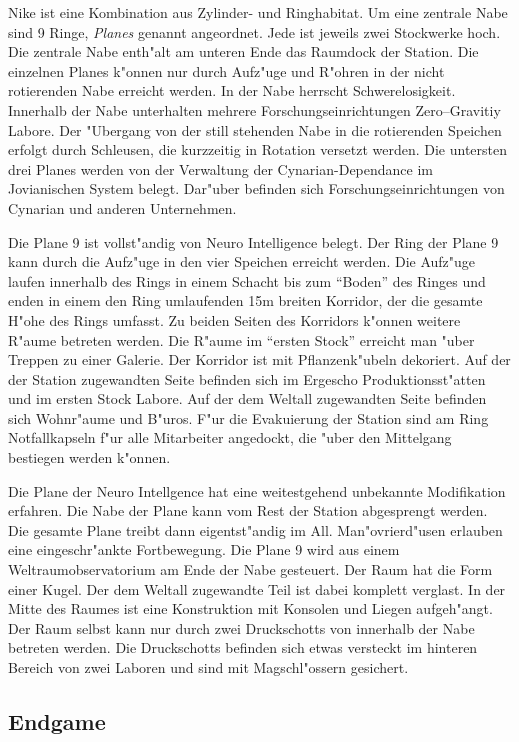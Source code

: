 Nike ist eine Kombination aus Zylinder- und Ringhabitat. Um eine zentrale Nabe sind 9 Ringe, \emph{Planes} genannt angeordnet. Jede ist jeweils zwei Stockwerke hoch. Die zentrale Nabe enth"alt am unteren Ende das Raumdock der Station.  Die einzelnen Planes k"onnen nur durch Aufz"uge und R"ohren in der nicht rotierenden Nabe erreicht werden. In der Nabe herrscht Schwerelosigkeit. Innerhalb der Nabe unterhalten mehrere Forschungseinrichtungen Zero--Gravitiy Labore. Der "Ubergang von der still stehenden Nabe in die rotierenden Speichen erfolgt durch Schleusen, die kurzzeitig in Rotation versetzt werden. Die untersten drei Planes werden von der Verwaltung der Cynarian-Dependance im Jovianischen System belegt. Dar"uber befinden sich Forschungseinrichtungen von Cynarian und anderen Unternehmen.

Die Plane 9 ist vollst"andig von Neuro Intelligence belegt. Der Ring der Plane 9 kann durch die Aufz"uge in den vier Speichen erreicht werden. Die Aufz"uge laufen innerhalb des Rings in einem Schacht bis zum "`Boden"' des Ringes und enden in einem den Ring umlaufenden 15m breiten Korridor, der die gesamte H"ohe des Rings umfasst. Zu beiden Seiten des Korridors k"onnen weitere R"aume betreten werden. Die R"aume im "`ersten Stock"' erreicht man "uber Treppen zu einer Galerie. Der Korridor ist mit Pflanzenk"ubeln dekoriert. Auf der der Station zugewandten Seite befinden sich im Ergescho\3 Produktionsst"atten und im ersten Stock Labore. Auf der dem Weltall zugewandten Seite befinden sich Wohnr"aume und B"uros. F"ur die Evakuierung der Station sind am Ring Notfallkapseln f"ur alle Mitarbeiter angedockt, die "uber den Mittelgang bestiegen werden k"onnen.

Die Plane der Neuro Intellgence hat eine weitestgehend unbekannte Modifikation erfahren. Die Nabe der Plane kann vom Rest der Station abgesprengt werden. Die gesamte Plane treibt dann eigentst"andig im All. Man"ovrierd"usen erlauben eine eingeschr"ankte Fortbewegung. Die Plane 9 wird aus einem Weltraumobservatorium am Ende der Nabe gesteuert. Der Raum hat die Form einer Kugel. Der dem Weltall zugewandte Teil ist dabei komplett verglast. In der Mitte des Raumes ist eine Konstruktion mit Konsolen und Liegen aufgeh"angt. Der Raum selbst kann nur durch zwei Druckschotts von innerhalb der Nabe betreten werden. Die Druckschotts befinden sich etwas versteckt im hinteren Bereich von zwei Laboren und sind mit Magschl"ossern gesichert.

\subsection{Endgame}

